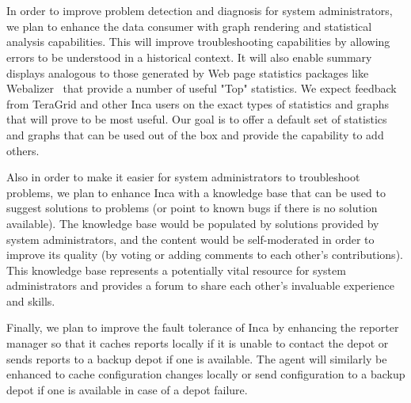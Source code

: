 \documentclass[times,10pt,twocolumn]{article}
\begin{document}
~\newpage

~\newpage

In order to improve problem detection and diagnosis for system administrators,
we plan to enhance the data consumer with graph rendering and statistical
analysis capabilities.  This will improve troubleshooting capabilities by
allowing errors to be understood in a historical context.  It will also enable
summary displays analogous to those generated by Web page statistics packages
like Webalizer~\cite{webalizer} that provide a number of useful "Top"
statistics.  We expect feedback from TeraGrid and other Inca users on the
exact types of statistics and graphs that will prove to be most useful.  Our
goal is to offer a default set of statistics and graphs that can be used out
of the box and provide the capability to add others.

Also in order to make it easier for system administrators to troubleshoot
problems, we plan to enhance Inca with a knowledge base that can be used to
suggest solutions to problems (or point to known bugs if there is no solution
available).  The knowledge base would be populated by solutions provided by
system administrators, and the content would be self-moderated in order to
improve its quality (by voting or adding comments to each other's
contributions).  This knowledge base represents a potentially vital resource
for system administrators and provides a forum to share each other's
invaluable experience and skills.   

Finally, we plan to improve the fault tolerance of Inca by enhancing the
reporter manager so that it caches reports locally if it is unable to
contact the depot or sends reports to a backup depot if one is available.
The agent will similarly be enhanced to cache configuration changes locally or
send configuration to a backup depot if one is available in case of a depot
failure.


~\newpage



\end{document}
